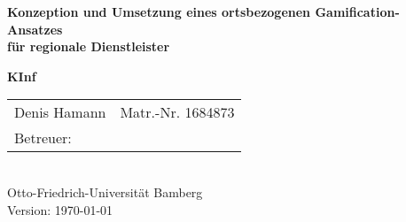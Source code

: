 \begin{titlepage}

{\sffamily
\vspace*{2cm}
\begin{center}
	\bfseries
	\LARGE {Konzeption und Umsetzung eines ortsbezogenen Gamification-Ansatzes\\
	für regionale Dienstleister}
\end{center}
\vspace{1cm}
\begin{center}

	{\Large\bfseries KInf\\[5mm]}

	\begin{tabular}{ll}
		Denis Hamann & Matr.-Nr. 1684873 \\[3mm]
		
		Betreuer: & \\[3mm]


	\end{tabular}\\[0.5cm]
	
{\scriptsize Otto-Friedrich-Universität Bamberg} \\[21pt]


{\footnotesize Version: \today }



\end{center}
}
\end{titlepage}
